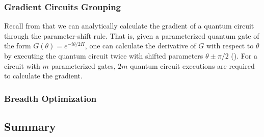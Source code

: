 \subsubsection{Gradient Circuits Grouping}
Recall from  that we can analytically calculate the gradient of a quantum circuit through the parameter-shift rule.
That is, given a parameterized quantum gate of the form $G(\theta) = e^{-i\theta/2 H}$, one can calculate the derivative of $G$ with respect to $\theta$ by executing the quantum circuit twice with shifted parameters $\theta \pm \pi/2$ ().
For a circuit with $m$ parameterized gates, $2m$ quantum circuit executions are required to calculate the gradient.

\subsubsection{Breadth Optimization}

\subsection{Summary}
